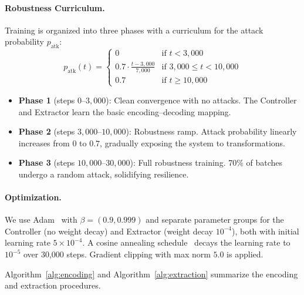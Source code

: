 \documentclass[10pt, twocolumn]{article}
\begin{document}
\paragraph{Robustness Curriculum.}
Training is organized into three phases with a curriculum for the attack probability $p_\text{atk}$:
\begin{equation}
    p_\text{atk}(t) = \begin{cases}
        0 & \text{if } t < 3{,}000 \\
        0.7 \cdot \frac{t - 3{,}000}{7{,}000} & \text{if } 3{,}000 \leq t < 10{,}000 \\
        0.7 & \text{if } t \geq 10{,}000
    \end{cases}
    \label{eq:curriculum}
\end{equation}

\begin{itemize}[itemsep=1pt, topsep=2pt]
    \item \textbf{Phase 1} (steps $0$--$3{,}000$): Clean convergence with no attacks. The Controller and Extractor learn the basic encoding--decoding mapping.
    \item \textbf{Phase 2} (steps $3{,}000$--$10{,}000$): Robustness ramp. Attack probability linearly increases from $0$ to $0.7$, gradually exposing the system to transformations.
    \item \textbf{Phase 3} (steps $10{,}000$--$30{,}000$): Full robustness training. 70\% of batches undergo a random attack, solidifying resilience.
\end{itemize}

\paragraph{Optimization.}
We use Adam~\cite{kingma2014adam} with $\beta = (0.9, 0.999)$ and separate parameter groups for the Controller (no weight decay) and Extractor (weight decay $10^{-4}$), both with initial learning rate $5 \times 10^{-4}$.
A cosine annealing schedule~\cite{loshchilov2017sgdr} decays the learning rate to $10^{-5}$ over 30{,}000 steps.
Gradient clipping with max norm $5.0$ is applied.

Algorithm~\ref{alg:encoding} and Algorithm~\ref{alg:extraction} summarize the encoding and extraction procedures.
\end{document}
